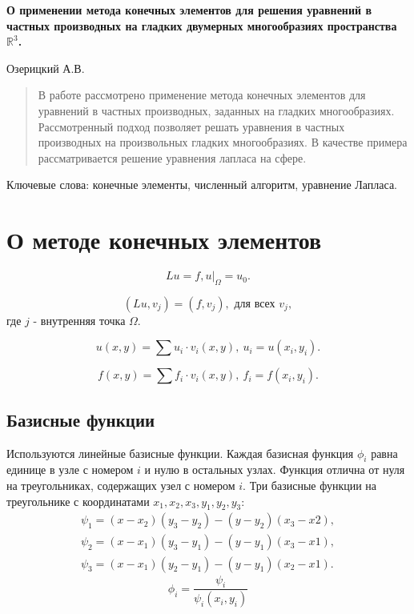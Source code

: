 \documentclass[a4paper]{article}
\begin{document}

{\bf \Large О применении метода конечных элементов для решения
  уравнений в частных производных на гладких двумерных многообразиях
  пространства ${\mathbb R}^{3}$.}

\begin{center}
Озерицкий А.В.
\end{center}

\renewcommand{\abstractname}{}
\begin{abstract}
{\small
{}
В работе рассмотрено применение метода конечных элементов для
уравнений в частных производных, заданных на гладких многообразиях.
Рассмотренный подход позволяет решать уравнения в частных производных
на произвольных гладких многообразиях. 
В качестве примера рассматривается решение уравнения лапласа на сфере.}
\end{abstract}

Ключевые слова: конечные элементы, численный алгоритм, уравнение
Лапласа.

\section*{О методе конечных элементов}
\begin{equation*}
Lu = f,
u|_\Omega=u_0.
\end{equation*}

\begin{equation*}
(Lu, v_j) = (f, v_j), \text{ для всех } v_j,
\end{equation*}
где $j$ - внутренняя точка $\Omega$.

\begin{equation*}
u(x,y)=\sum u_i \cdot v_i (x, y),\ u_i=u(x_i,y_i).
\end{equation*}

\begin{equation*}
f(x,y)=\sum f_i \cdot v_i (x, y),\ f_i=f(x_i,y_i).
\end{equation*}

\subsection*{Базисные  функции}
Используются линейные базисные функции. Каждая базисная функция
$\phi_i$ равна единице в узле с номером $i$ и нулю в остальных
узлах. Функция отлична от нуля на треугольниках, содержащих узел с
номером $i$. 
Три базисные функции на треугольнике с координатами $x_1,x_2,x_3, y_1,y_2,y_3$:
\begin{equation}\label{basis}
\begin{split}
\psi_1=(x-x_2)(y_3-y_2)-(y-y_2)(x_3-x2),\\
\psi_2=(x-x_1)(y_3-y_1)-(y-y_1)(x_3-x1),\\
\psi_3=(x-x_1)(y_2-y_1)-(y-y_1)(x_2-x1).
\end{split}
\end{equation}
\begin{equation*}
\phi_i=\frac{\psi_i}{\psi_i(x_i,y_i)}
\end{equation*}
\end{document}
